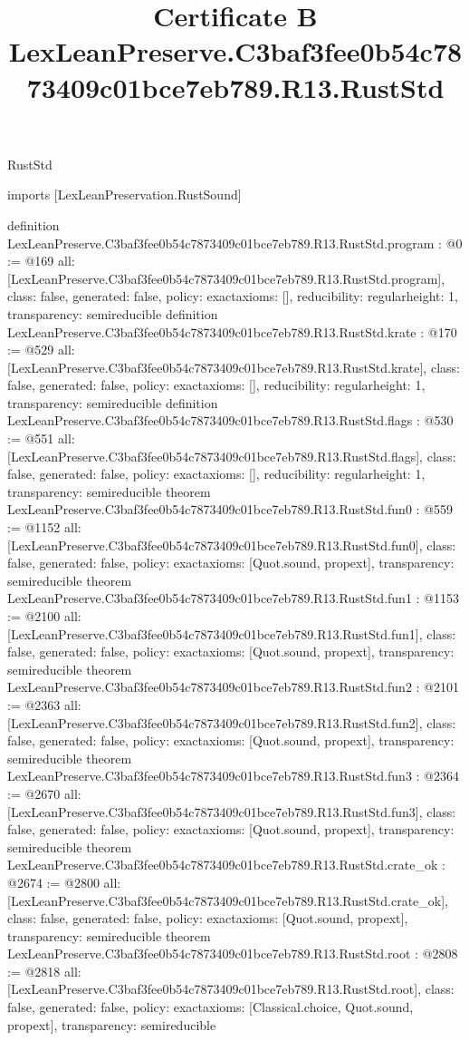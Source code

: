 \begin{lexlean}{RustStd}
\title{Certificate B LexLeanPreserve.C3baf3fee0b54c7873409c01bce7eb789.R13.RustStd}
\begin{coremodule}
imports [LexLeanPreservation.RustSound]

definition LexLeanPreserve.C3baf3fee0b54c7873409c01bce7eb789.R13.RustStd.program : @0 := @169 {
  all: [LexLeanPreserve.C3baf3fee0b54c7873409c01bce7eb789.R13.RustStd.program],
  class: false,
  generated: false,
  policy: exact{axioms: []},
  reducibility: regular{height: 1},
  transparency: semireducible
}
definition LexLeanPreserve.C3baf3fee0b54c7873409c01bce7eb789.R13.RustStd.krate : @170 := @529 {
  all: [LexLeanPreserve.C3baf3fee0b54c7873409c01bce7eb789.R13.RustStd.krate],
  class: false,
  generated: false,
  policy: exact{axioms: []},
  reducibility: regular{height: 1},
  transparency: semireducible
}
definition LexLeanPreserve.C3baf3fee0b54c7873409c01bce7eb789.R13.RustStd.flags : @530 := @551 {
  all: [LexLeanPreserve.C3baf3fee0b54c7873409c01bce7eb789.R13.RustStd.flags],
  class: false,
  generated: false,
  policy: exact{axioms: []},
  reducibility: regular{height: 1},
  transparency: semireducible
}
theorem LexLeanPreserve.C3baf3fee0b54c7873409c01bce7eb789.R13.RustStd.fun0 : @559 := @1152 {
  all: [LexLeanPreserve.C3baf3fee0b54c7873409c01bce7eb789.R13.RustStd.fun0],
  class: false,
  generated: false,
  policy: exact{axioms: [Quot.sound, propext]},
  transparency: semireducible
}
theorem LexLeanPreserve.C3baf3fee0b54c7873409c01bce7eb789.R13.RustStd.fun1 : @1153 := @2100 {
  all: [LexLeanPreserve.C3baf3fee0b54c7873409c01bce7eb789.R13.RustStd.fun1],
  class: false,
  generated: false,
  policy: exact{axioms: [Quot.sound, propext]},
  transparency: semireducible
}
theorem LexLeanPreserve.C3baf3fee0b54c7873409c01bce7eb789.R13.RustStd.fun2 : @2101 := @2363 {
  all: [LexLeanPreserve.C3baf3fee0b54c7873409c01bce7eb789.R13.RustStd.fun2],
  class: false,
  generated: false,
  policy: exact{axioms: [Quot.sound, propext]},
  transparency: semireducible
}
theorem LexLeanPreserve.C3baf3fee0b54c7873409c01bce7eb789.R13.RustStd.fun3 : @2364 := @2670 {
  all: [LexLeanPreserve.C3baf3fee0b54c7873409c01bce7eb789.R13.RustStd.fun3],
  class: false,
  generated: false,
  policy: exact{axioms: [Quot.sound, propext]},
  transparency: semireducible
}
theorem LexLeanPreserve.C3baf3fee0b54c7873409c01bce7eb789.R13.RustStd.crate_ok : @2674 := @2800 {
  all: [LexLeanPreserve.C3baf3fee0b54c7873409c01bce7eb789.R13.RustStd.crate_ok],
  class: false,
  generated: false,
  policy: exact{axioms: [Quot.sound, propext]},
  transparency: semireducible
}
theorem LexLeanPreserve.C3baf3fee0b54c7873409c01bce7eb789.R13.RustStd.root : @2808 := @2818 {
  all: [LexLeanPreserve.C3baf3fee0b54c7873409c01bce7eb789.R13.RustStd.root],
  class: false,
  generated: false,
  policy: exact{axioms: [Classical.choice, Quot.sound, propext]},
  transparency: semireducible
}


\end{coremodule}
\end{lexlean}
